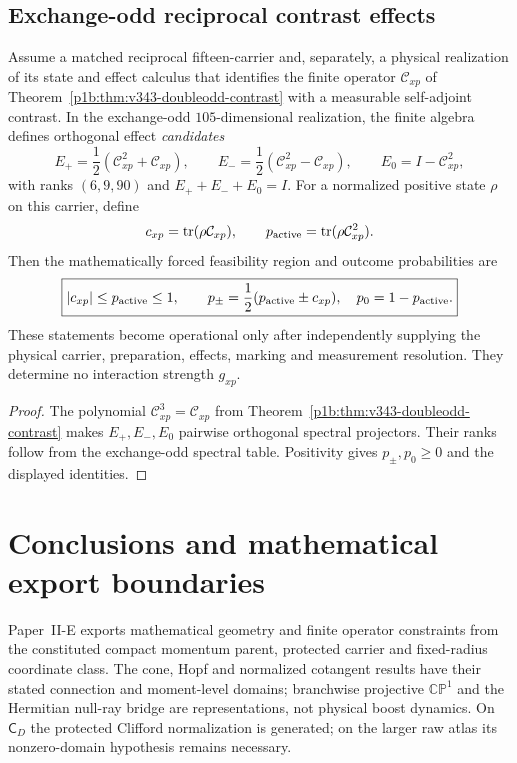 \documentclass[12pt,a4paper]{article}
\begin{document}
\subsection{Exchange-odd reciprocal contrast effects}
\begin{corollary}
\label{p2e:cor:v343-signed-correlation-export}
Assume a matched reciprocal fifteen-carrier and, separately,
a physical realization of its state and effect calculus that
identifies the finite operator $\mathcal C_{xp}$ of
Theorem~\ref{p1b:thm:v343-doubleodd-contrast} with a
measurable self-adjoint contrast.  In the exchange-odd
$105$-dimensional realization, the finite algebra defines
orthogonal effect \emph{candidates}
\[
 E_+=\frac12(\mathcal C_{xp}^2+\mathcal C_{xp}),\qquad
 E_-=\frac12(\mathcal C_{xp}^2-\mathcal C_{xp}),\qquad
 E_0=I-\mathcal C_{xp}^2,
\]
with ranks $(6,9,90)$ and $E_++E_-+E_0=I$.
For a normalized positive state $\rho$ on this carrier, define
\[
 c_{xp}=\operatorname{tr}(\rho\mathcal C_{xp}),\qquad
 p_{\rm active}=\operatorname{tr}(\rho\mathcal C_{xp}^2).
\]
Then the mathematically forced feasibility region and outcome
probabilities are
\[
 \boxed{|c_{xp}|\le p_{\rm active}\le1,\qquad
 p_\pm=\frac12(p_{\rm active}\pm c_{xp}),\quad
 p_0=1-p_{\rm active}.}
\]
These statements become operational only after independently
supplying the physical carrier, preparation, effects, marking
and measurement resolution.  They determine no interaction
strength $g_{xp}$.
\end{corollary}
\begin{proof}
The polynomial $\mathcal C_{xp}^3=\mathcal C_{xp}$ from
Theorem~\ref{p1b:thm:v343-doubleodd-contrast} makes $E_+,E_-,E_0$
pairwise orthogonal spectral projectors.  Their ranks follow from
the exchange-odd spectral table.  Positivity gives
$p_\pm,p_0\ge0$ and the displayed identities.
\end{proof}

\section{Conclusions and mathematical export boundaries}
Paper~II-E exports mathematical geometry and finite operator constraints
from the constituted compact momentum parent, protected carrier and
fixed-radius coordinate class.  The cone, Hopf and normalized cotangent
results have their stated connection and moment-level domains;
branchwise projective $\mathbb{CP}^1$ and the Hermitian null-ray bridge
are representations, not physical boost dynamics.  On $\mathsf C_D$ the
protected Clifford normalization is generated; on the larger raw atlas
its nonzero-domain hypothesis remains necessary.
\end{document}
